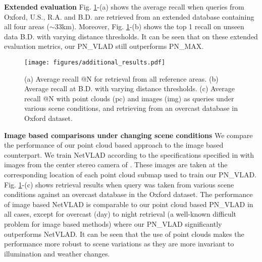 \documentclass[10pt,twocolumn,letterpaper]{article}
\begin{document}
\noindent\textbf{Extended evaluation}
Fig. \ref{fig:add_results}-(a) shows the average recall when queries from Oxford, U.S., R.A. and B.D. are retrieved from an extended database containing all four areas ($\sim33$km). Moreover, Fig. \ref{fig:add_results}-(b) shows the top 1 recall on unseen data B.D. with varying distance thresholds. It can be seen that on these extended evaluation metrics, our PN\_VLAD still outperforms PN\_MAX.
\newline
\begin{figure}[t]
	\begin{center}
\texttt{[image: figures/additional\_results.pdf]}
	\end{center}
	\vspace{-0.4cm}
	\caption{(a) Average recall @N for retrieval from all reference areas. (b) Average recall at B.D. with varying distance thresholds. (c) Average recall @N with point clouds (pc) and images (img) as queries under various scene conditions, and retrieving from an overcast database in Oxford dataset.\vspace{-0.4cm}}
	\label{fig:add_results}
\end{figure}

\vspace{-0.2cm}
\noindent\textbf{Image based comparisons under changing scene conditions}
We compare the performance of our point cloud based approach to the image based counterpart. We train NetVLAD according to the specifications specified in \cite{Arandjelovic16} with images from the center stereo camera of \cite{RobotCarDatasetIJRR}. These images are taken at the corresponding location of each point cloud submap used to train our PN\_VLAD. Fig. \ref{fig:add_results}-(c) shows retrieval results when query was taken from various scene conditions against an overcast database in the Oxford dataset. The performance of image based NetVLAD is comparable to our point cloud based PN\_VLAD in all cases, except for overcast (day) to night retrieval (a well-known difficult problem for image based methods) where our PN\_VLAD significantly outperforms NetVLAD. It can be seen that the use of point clouds makes the performance more robust to scene variations as they are more invariant to illumination and weather changes.
\newline
\end{document}
